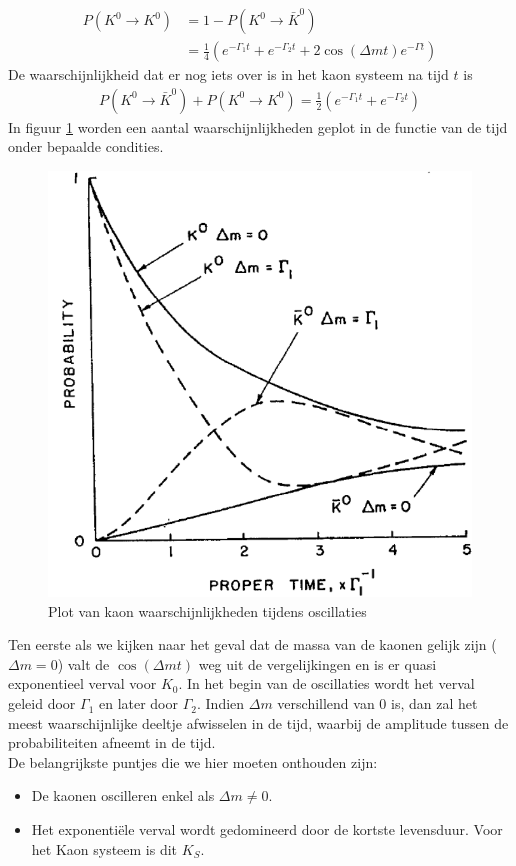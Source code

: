 \documentclass[../main.tex]{subfiles}
\begin{document}
\begin{equation}
    \begin{aligned}
        \label{eq:voorbeeld_kaon_osc_tijd_prop_4}
        P\left(K^{0} \rightarrow K^{0}\right) &= 1-P\left(K^{0} \rightarrow \bar{K}^{0}\right)\\
                                              &=\frac{1}{4}\left(e^{-\Gamma_{1} t}+e^{-\Gamma_{2} t}+2 \cos (\Delta m t) e^{-\Gamma t}\right)
    \end{aligned}
\end{equation}
De waarschijnlijkheid dat er nog iets over is in het kaon systeem na tijd $t$ is
\begin{equation}
    \begin{aligned}
        \label{eq:voorbeeld_kaon_osc_tijd_prop_5}
        P\left(K^{0} \rightarrow \bar{K}^{0}\right)+P\left(K^{0} \rightarrow K^{0}\right)=\frac{1}{2}\left(e^{-\Gamma_{1} t}+e^{-\Gamma_{2} t}\right)
    \end{aligned}
\end{equation}
In figuur \ref{fig:meson_mixing_and_oscillations/kaon_osc_tijd_plot} worden een aantal waarschijnlijkheden geplot in de functie van de tijd onder bepaalde condities.

\begin{figure}[h]
    \centering
    \includegraphics[width=0.5\linewidth]{meson_mixing_and_oscillations/kaon_osc_tijd_plot.png}
    \caption{Plot van kaon waarschijnlijkheden tijdens oscillaties}%
    \label{fig:meson_mixing_and_oscillations/kaon_osc_tijd_plot}
\end{figure}

Ten eerste als we kijken naar het geval dat de massa van de kaonen gelijk zijn ($\Delta m = 0$) valt de $\cos(\Delta m t)$ weg uit de vergelijkingen en is er quasi exponentieel verval voor $K_0$. In het begin van de oscillaties wordt het verval geleid door $\Gamma_1$ en later door $\Gamma_2$. Indien $\Delta m$ verschillend van 0 is, dan zal het meest waarschijnlijke deeltje afwisselen in de tijd, waarbij de amplitude tussen de probabiliteiten afneemt in de tijd.\\
De belangrijkste puntjes die we hier moeten onthouden zijn:
\begin{itemize}
    \item De kaonen oscilleren enkel als $\Delta m \neq 0$.
    \item Het exponentiële verval wordt gedomineerd door de kortste levensduur. Voor het Kaon systeem is dit $K_S$.
\end{itemize}
\end{document}
